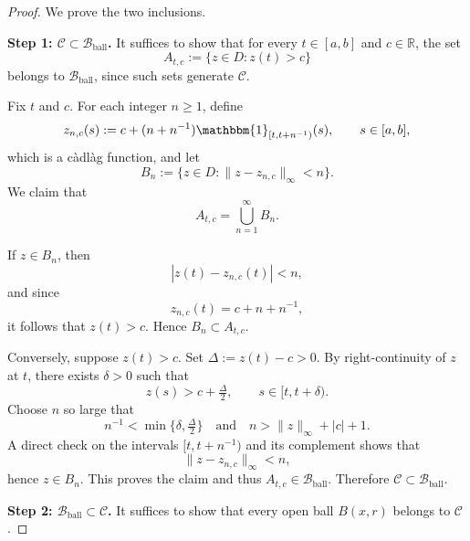 \documentclass[12pt]{article}
\renewcommand{\(}{\left(}%
\renewcommand{\)}{\right)}%
\renewcommand{\[}{\left[}%
\renewcommand{\]}{\right]}%
\newtheorem{proof}{Proof.}}
\begin{document}
\begin{proof}
We prove the two inclusions.

\medskip
\noindent\textbf{Step 1: $\mathcal C\subset\mathcal B_{\mathrm{ball}}$.}
It suffices to show that for every $t\in[a,b]$ and $c\in\mathbb R$, the set
\begin{equation*}
A_{t,c}:=\{z\in D:z(t)>c\}
\end{equation*}
belongs to $\mathcal B_{\mathrm{ball}}$, since such sets generate $\mathcal C$.

Fix $t$ and $c$. For each integer $n\ge1$, define
\begin{equation*}
z_{n,c}(s):=c+(n+n^{-1})\mathbbm{ 1}_{[t,t+n^{-1})}(s),
\qquad s\in[a,b],
\end{equation*}
which is a c\`adl\`ag function, and let
\begin{equation*}
B_n:=\{z\in D:\|z-z_{n,c}\|_\infty<n\}.
\end{equation*}
We claim that
\begin{equation*}
A_{t,c}=\bigcup_{n=1}^\infty B_n.
\end{equation*}

If $z\in B_n$, then
\begin{equation*}
|z(t)-z_{n,c}(t)|<n,
\end{equation*}
and since
\begin{equation*}
z_{n,c}(t)=c+n+n^{-1},
\end{equation*}
it follows that $z(t)>c$. Hence $B_n\subset A_{t,c}$.

Conversely, suppose $z(t)>c$. Set $\Delta:=z(t)-c>0$. By right-continuity of $z$ at $t$, there exists $\delta>0$ such that
\begin{equation*}
z(s)>c+\tfrac{\Delta}{2}, \qquad s\in[t,t+\delta).
\end{equation*}
Choose $n$ so large that
\begin{equation*}
n^{-1}<\min\{\delta,\tfrac{\Delta}{2}\}
\quad\text{and}\quad
n>\|z\|_\infty+|c|+1.
\end{equation*}
A direct check on the intervals $[t,t+n^{-1})$ and its complement shows that
\begin{equation*}
\|z-z_{n,c}\|_\infty<n,
\end{equation*}
hence $z\in B_n$.
This proves the claim and thus $A_{t,c}\in\mathcal B_{\mathrm{ball}}$.
Therefore $\mathcal C\subset\mathcal B_{\mathrm{ball}}$.

\medskip
\noindent\textbf{Step 2: $\mathcal B_{\mathrm{ball}}\subset\mathcal C$.}
It suffices to show that every open ball $B(x,r)$ belongs to $\mathcal C$.


\end{proof}
\end{document}

